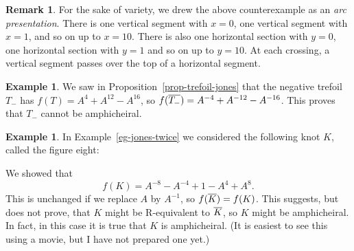 \documentclass[reqno]{amsart}
\theoremstyle{definition}
\newtheorem{remark}[theorem]{Remark}
\newtheorem{example}[theorem]{Example}
\begin{document}
\begin{remark}
 For the sake of variety, we drew the above counterexample as an
 \emph{arc presentation}.  There is one vertical segment with $x=0$,
 one vertical segment with $x=1$, and so on up to $x=10$.  There is
 also one horizontal section with $y=0$, one horizontal section with
 $y=1$ and so on up to $y=10$.  At each crossing, a vertical segment
 passes over the top of a horizontal segment.
\end{remark}

\begin{example}
 We saw in Proposition~\ref{prop-trefoil-jones} that the negative
 trefoil $T_-$ has $f(T)=A^4+A^{12}-A^{16}$, so
 $f(\overline{T_-})=A^{-4}+A^{-12}-A^{-16}$.  This proves that $T_-$ cannot be
 amphicheiral. 
\end{example}

\begin{example}
 In Example~\ref{eg-jones-twice} we considered the following knot $K$,
 called the figure eight:
 \begin{center}
 \end{center}
 We showed that 
 \[ f(K) = A^{-8} - A^{-4} + 1 - A^4 + A^8. \]
 This is unchanged if we replace $A$ by $A^{-1}$, so
 $f(\overline{K})=f(K)$.  This suggests, but does not prove, that $K$ might
 be R-equivalent to $\overline{K}$, so $K$ might be amphicheiral.  In fact,
 in this case it is true that $K$ is amphicheiral.  (It is easiest to
 see this using a movie, but I have not prepared one yet.)
\end{example}
\end{document}
